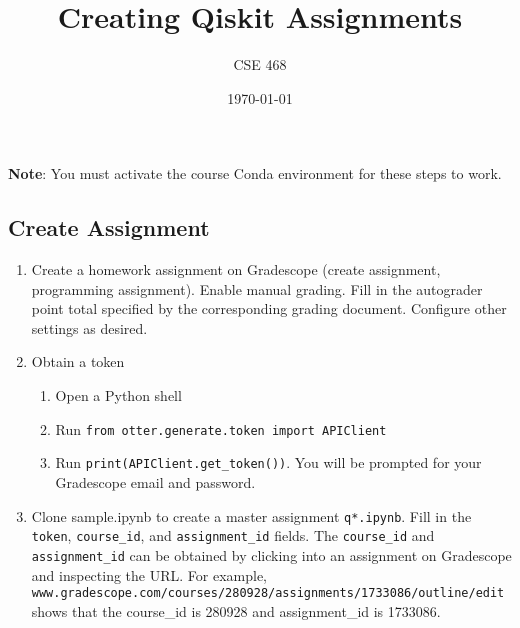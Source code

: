 \documentclass[12pt]{article}
\title{Creating Qiskit Assignments}
\author{CSE 468}
\date{\today}
\begin{document}
\maketitle

\noindent \textbf{Note}: You must activate the course Conda environment for these steps to work.

\subsection*{Create Assignment}
\begin{enumerate}[font=\bfseries]
    \item Create a homework assignment on Gradescope (create assignment, programming assignment). Enable manual grading. Fill in the autograder point total specified by the corresponding grading document. Configure other settings as desired.
    \item Obtain a token
    \begin{enumerate}
        \item Open a Python shell
        \item Run \texttt{from otter.generate.token import APIClient}
        \item Run \texttt{print(APIClient.get\_token())}. You will be prompted for your Gradescope email and password.
    \end{enumerate}
    \item Clone sample.ipynb to create a master assignment \texttt{q*.ipynb}. Fill in the \texttt{token}, \texttt{course\_id}, and \texttt{assignment\_id} fields. The \texttt{course\_id} and \texttt{assignment\_id} can be obtained by clicking into an assignment on Gradescope and inspecting the URL.
    For example,\\ \texttt{www.gradescope.com/courses/280928/assignments/1733086/outline/edit} shows that the course\_id is 280928 and assignment\_id is 1733086.
\end{enumerate}
\newpage
\end{document}
